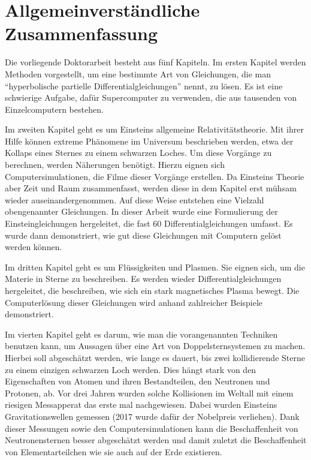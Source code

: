 \chapter*{Allgemeinverständliche Zusammenfassung}

Die vorliegende Doktorarbeit besteht aus fünf Kapiteln. Im ersten
Kapitel werden Methoden vorgestellt, um eine bestimmte Art von
Gleichungen, die man ``hyperbolische partielle
Differentialgleichungen'' nennt, zu lösen. Es ist eine schwierige
Aufgabe, dafür Supercomputer zu verwenden, die aus tausenden von
Einzelcomputern bestehen.

Im zweiten Kapitel geht es um Einsteins allgemeine Relativitätstheorie.
Mit ihrer Hilfe können extreme Phänomene im Universum beschrieben 
werden, etwa der Kollaps eines Sternes zu einem schwarzen Loches. Um
diese Vorgänge zu berechnen, werden Näherungen benötigt. Hierzu
eignen sich Computersimulationen, die Filme dieser Vorgänge erstellen.
Da Einsteins Theorie aber Zeit und Raum zusammenfasst, werden diese
in dem Kapitel erst mühsam wieder auseinandergenommen. Auf diese Weise
entstehen eine Vielzahl obengenannter Gleichungen. In dieser Arbeit
wurde eine Formulierung der Einsteingleichungen hergeleitet, die fast
60 Differentialgleichungen umfasst. Es wurde dann demonstriert, wie gut
diese Gleichungen mit Computern gelöst werden können.

Im dritten Kapitel geht es um Flüssigkeiten und Plasmen. Sie eignen
sich, um die Materie in Sterne zu beschreiben. Es werden wieder
Differentialgleichungen hergeleitet, die beschreiben, wie sich ein
stark magnetisches Plasma bewegt. Die Computerlösung dieser Gleichungen
wird anhand zahlreicher Beispiele demonstriert.

Im vierten Kapitel geht es darum, wie man die vorangenannten Techniken
benutzen kann, um Aussagen über eine Art von Doppelsternsystemen zu
machen. Hierbei soll abgeschätzt werden, wie lange es dauert, bis zwei
kollidierende Sterne zu einem einzigen schwarzen Loch werden. Dies
hängt stark von den Eigenschaften von Atomen und ihren Bestandteilen,
den Neutronen und Protonen, ab. Vor drei Jahren wurden solche 
Kollisionen im Weltall mit einem riesigen Messapperat das erste mal
nachgewiesen. Dabei wurden Einsteins Gravitationswellen gemessen (2017
wurde dafür der Nobelpreis verliehen). Dank dieser Messungen sowie den
Computersimulationen kann die Beschaffenheit von Neutronensternen
besser abgeschätzt werden und damit zuletzt die Beschaffenheit von
Elementarteilchen wie sie auch auf der Erde existieren.
